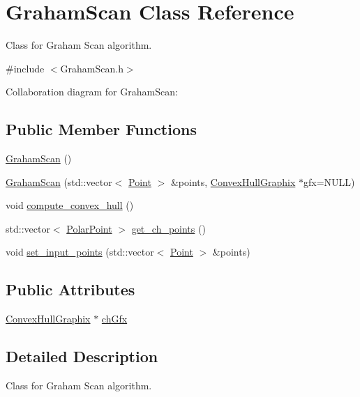 \hypertarget{class_graham_scan}{}\section{Graham\+Scan Class Reference}
\label{class_graham_scan}


Class for Graham Scan algorithm.  




{\ttfamily \#include $<$Graham\+Scan.\+h$>$}



Collaboration diagram for Graham\+Scan\+:
\subsection*{Public Member Functions}
\begin{DoxyCompactItemize}
\item 
\mbox{\hyperlink{class_graham_scan_a207506a925528a889c377b39a24d879f}{Graham\+Scan}} ()
\item 
\mbox{\hyperlink{class_graham_scan_afb51d5144cdee5df588528701b63de36}{Graham\+Scan}} (std\+::vector$<$ \mbox{\hyperlink{class_point}{Point}} $>$ \&points, \mbox{\hyperlink{class_convex_hull_graphix}{Convex\+Hull\+Graphix}} $\ast$gfx=N\+U\+LL)
\item 
void \mbox{\hyperlink{class_graham_scan_a38ecf7b830f7923c4d889fa126349a7e}{compute\+\_\+convex\+\_\+hull}} ()
\item 
std\+::vector$<$ \mbox{\hyperlink{class_polar_point}{Polar\+Point}} $>$ \mbox{\hyperlink{class_graham_scan_af42f09a4283ae9821917e13322be4b49}{get\+\_\+ch\+\_\+points}} ()
\item 
void \mbox{\hyperlink{class_graham_scan_a4e22ff4e4ee0cb57ae30bd06fd39871b}{set\+\_\+input\+\_\+points}} (std\+::vector$<$ \mbox{\hyperlink{class_point}{Point}} $>$ \&points)
\end{DoxyCompactItemize}
\subsection*{Public Attributes}
\begin{DoxyCompactItemize}
\item 
\mbox{\hyperlink{class_convex_hull_graphix}{Convex\+Hull\+Graphix}} $\ast$ \mbox{\hyperlink{class_graham_scan_a3c5dda4a0c904b22a179511cc1d879ce}{ch\+Gfx}}
\end{DoxyCompactItemize}


\subsection{Detailed Description}
Class for Graham Scan algorithm. 

